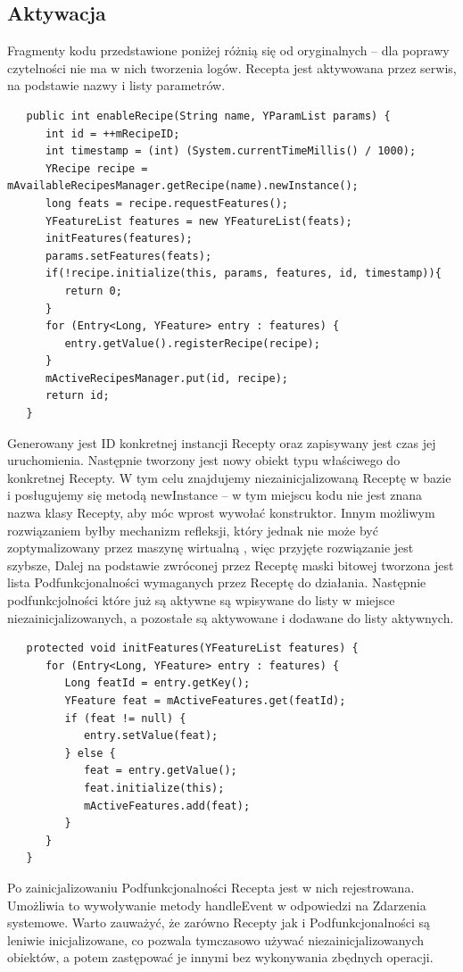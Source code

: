 \documentclass[11pt,a4paper,polish,thesis]{dcsbook}
\begin{document}
\subsection{Aktywacja}
Fragmenty kodu przedstawione poniżej różnią się od oryginalnych -- dla poprawy czytelności nie ma w nich tworzenia logów.
Recepta jest aktywowana przez serwis, na podstawie nazwy i listy parametrów.
\begin{verbatim}
   public int enableRecipe(String name, YParamList params) {
      int id = ++mRecipeID;
      int timestamp = (int) (System.currentTimeMillis() / 1000);
      YRecipe recipe = mAvailableRecipesManager.getRecipe(name).newInstance();
      long feats = recipe.requestFeatures();
      YFeatureList features = new YFeatureList(feats);
      initFeatures(features);
      params.setFeatures(feats);
      if(!recipe.initialize(this, params, features, id, timestamp)){
         return 0;
      }
      for (Entry<Long, YFeature> entry : features) {
         entry.getValue().registerRecipe(recipe);
      }
      mActiveRecipesManager.put(id, recipe);
      return id;
   }
\end{verbatim}
Generowany jest ID konkretnej instancji Recepty oraz zapisywany jest czas jej uruchomienia.
Następnie tworzony jest nowy obiekt typu właściwego do konkretnej Recepty. W tym celu znajdujemy niezainicjalizowaną Receptę w bazie i posługujemy się metodą newInstance -- w tym miejscu kodu nie jest znana nazwa klasy Recepty, aby móc wprost wywołać konstruktor. Innym możliwym rozwiązaniem byłby mechanizm refleksji, który jednak nie może być zoptymalizowany przez maszynę wirtualną \cite{java}, więc przyjęte rozwiązanie jest szybsze, 
Dalej na podstawie zwróconej przez Receptę maski bitowej tworzona jest lista Podfunkcjonalności wymaganych przez Receptę do działania. Następnie podfunkcjolności które już są aktywne są wpisywane do listy w miejsce niezainicjalizowanych, a pozostałe są aktywowane i dodawane do listy aktywnych.

\begin{verbatim}
   protected void initFeatures(YFeatureList features) {
      for (Entry<Long, YFeature> entry : features) {
         Long featId = entry.getKey();
         YFeature feat = mActiveFeatures.get(featId);
         if (feat != null) {
            entry.setValue(feat);
         } else {
            feat = entry.getValue();
            feat.initialize(this);
            mActiveFeatures.add(feat);
         }
      }
   }
\end{verbatim}
Po zainicjalizowaniu Podfunkcjonalności Recepta jest w nich rejestrowana. Umożliwia to wywoływanie metody handleEvent w odpowiedzi na Zdarzenia systemowe. 
Warto zauważyć, że zarówno Recepty jak i Podfunkcjonalności są leniwie inicjalizowane, co pozwala tymczasowo używać niezainicjalizowanych obiektów, a potem zastępować je innymi bez wykonywania zbędnych operacji. 
\end{document}
